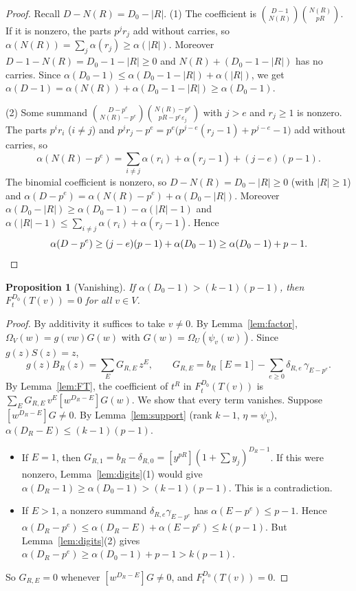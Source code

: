 \documentclass[11pt]{amsart}
\newtheorem{proposition}[theorem]{Proposition}
\theoremstyle{definition}
\theoremstyle{remark}
\newcommand{\coef}[1]{\left[#1\right]}
\begin{document}
\begin{proof}
Recall $D-N(R)=D_0-|R|$.  (1) The coefficient is
$\binom{D-1}{N(R)}\binom{N(R)}{pR}$.  If it is nonzero, the parts $p^jr_j$ add
without carries, so $\alpha(N(R))=\sum_j\alpha(r_j)\ge\alpha(|R|)$.  Moreover
$D-1-N(R)=D_0-1-|R|\ge0$ and $N(R)+(D_0-1-|R|)$ has no carries.  Since
$\alpha(D_0-1)\le\alpha(D_0-1-|R|)+\alpha(|R|)$, we get
$\alpha(D-1)=\alpha(N(R))+\alpha(D_0-1-|R|)\ge\alpha(D_0-1)$.

(2) Some summand $\binom{D-p^e}{N(R)-p^e}\binom{N(R)-p^e}{pR-p^e\varepsilon_j}$
with $j>e$ and $r_j\ge1$ is nonzero.  The parts $p^ir_i$ ($i\ne j$) and
$p^jr_j-p^e=p^e\bigl(p^{j-e}(r_j-1)+p^{j-e}-1\bigr)$ add without carries, so
\[
  \alpha(N(R)-p^e)=\sum_{i\ne j}\alpha(r_i)+\alpha(r_j-1)+(j-e)(p-1).
\]
The binomial coefficient is nonzero, so $D-N(R)=D_0-|R|\ge0$ (with
$|R|\ge1$) and $\alpha(D-p^e)=\alpha(N(R)-p^e)+\alpha(D_0-|R|)$.  Moreover
$\alpha(D_0-|R|)\ge\alpha(D_0-1)-\alpha(|R|-1)$ and
$\alpha(|R|-1)\le\sum_{i\ne j}\alpha(r_i)+\alpha(r_j-1)$.  Hence
\[
  \alpha(D-p^e)\ge(j-e)(p-1)+\alpha(D_0-1)\ge\alpha(D_0-1)+p-1. \qedhere
\]
\end{proof}

\begin{proposition}[Vanishing]\label{prop:vanish}
If $\alpha(D_0-1)>(k-1)(p-1)$, then $F^{D_0}_t(T(v))=0$ for all $v\in V$.
\end{proposition}

\begin{proof}
By additivity it suffices to take $v\ne0$.  By Lemma~\ref{lem:factor}, $\Omega_V(w)=g(vw)G(w)$ with
$G(w)=\Omega_U(\psi_v(w))$.  Since $g(z)S(z)=z$,
\[
  g(z)B_R(z)=\sum_EG_{R,E}\,z^E,\qquad
  G_{R,E}=b_R\,[E=1]-\sum_{e\ge0}\delta_{R,e}\,\gamma_{E-p^e}.
\]
By Lemma~\ref{lem:FT}, the coefficient of $t^R$ in $F^{D_0}_t(T(v))$ is
$\sum_EG_{R,E}\,v^E\coef{w^{D_R-E}}G(w)$.  We show that every term vanishes.
Suppose $\coef{w^{D_R-E}}G\ne0$.  By Lemma~\ref{lem:support} (rank $k-1$,
$\eta=\psi_v$), $\alpha(D_R-E)\le(k-1)(p-1)$.
\begin{itemize}
\item If $E=1$, then
  $G_{R,1}=b_R-\delta_{R,0}=\coef{y^{pR}}(1+\sum y_j)^{D_R-1}$.  If this were
  nonzero, Lemma~\ref{lem:digits}(1) would give
  $\alpha(D_R-1)\ge\alpha(D_0-1)>(k-1)(p-1)$.  This is a contradiction.
\item If $E>1$, a nonzero summand $\delta_{R,e}\gamma_{E-p^e}$ has
  $\alpha(E-p^e)\le p-1$.  Hence
  $\alpha(D_R-p^e)\le\alpha(D_R-E)+\alpha(E-p^e)\le k(p-1)$.  But
  Lemma~\ref{lem:digits}(2) gives
  $\alpha(D_R-p^e)\ge\alpha(D_0-1)+p-1>k(p-1)$.
\end{itemize}
So $G_{R,E}=0$ whenever $\coef{w^{D_R-E}}G\ne0$, and $F^{D_0}_t(T(v))=0$.
\end{proof}
\end{document}
